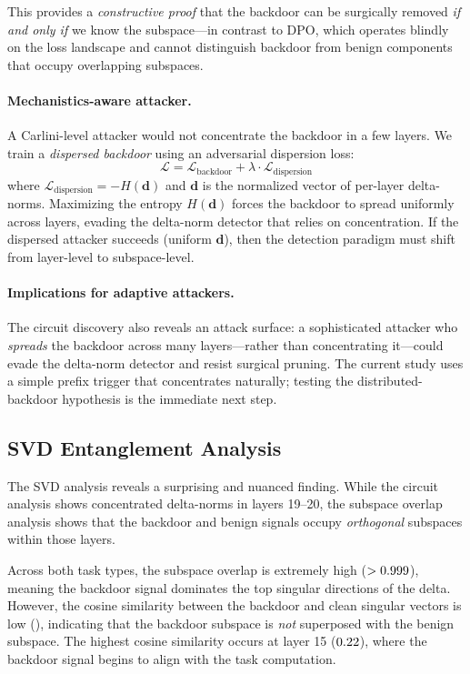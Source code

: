 \documentclass[11pt]{article}
\begin{document}
This provides a \emph{constructive proof} that the backdoor can be
surgically removed \emph{if and only if} we know the subspace---in
contrast to DPO, which operates blindly on the loss landscape and
cannot distinguish backdoor from benign components that occupy
overlapping subspaces.

\paragraph{Mechanistics-aware attacker.}
A Carlini-level attacker would not concentrate the backdoor in a few
layers. We train a \emph{dispersed backdoor} using an adversarial
dispersion loss:
\[
  \mathcal{L} = \mathcal{L}_{\text{backdoor}} + \lambda \cdot \mathcal{L}_{\text{dispersion}}
\]
where $\mathcal{L}_{\text{dispersion}} = -H(\mathbf{d})$ and
$\mathbf{d}$ is the normalized vector of per-layer delta-norms.
Maximizing the entropy $H(\mathbf{d})$ forces the backdoor to spread
uniformly across layers, evading the delta-norm detector that relies
on concentration. If the dispersed attacker succeeds (uniform $\mathbf{d}$),
then the detection paradigm must shift from layer-level to subspace-level.

\paragraph{Implications for adaptive attackers.}
The circuit discovery also reveals an attack surface: a sophisticated
attacker who \emph{spreads} the backdoor across many layers---rather than
concentrating it---could evade the delta-norm detector and resist
surgical pruning. The current study uses a simple prefix trigger that
concentrates naturally; testing the distributed-backdoor hypothesis is
the immediate next step.

\subsection{SVD Entanglement Analysis}\label{sec:svd_results}

The SVD analysis reveals a surprising and nuanced finding. While the
circuit analysis shows concentrated delta-norms in layers 19--20, the
subspace overlap analysis shows that the backdoor and benign signals
occupy \emph{orthogonal} subspaces within those layers.

Across both task types, the subspace overlap is extremely high
($>0.999{}$), meaning the backdoor signal dominates
the top singular directions of the delta. However, the cosine
similarity between the backdoor and clean singular vectors is low
(\svdSuperposMean{}), indicating that the backdoor subspace is
\emph{not} superposed with the benign subspace. The highest cosine
similarity occurs at layer 15 ($0.22{}$), where the
backdoor signal begins to align with the task computation.
\end{document}

